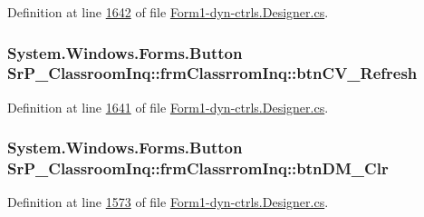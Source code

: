 \-Definition at line \hyperlink{_form1-dyn-ctrls_8_designer_8cs_source_l01642}{1642} of file \hyperlink{_form1-dyn-ctrls_8_designer_8cs_source}{\-Form1-\/dyn-\/ctrls.\-Designer.\-cs}.

\hypertarget{class_sr_p___classroom_inq_1_1frm_classrrom_inq_acab3b8f1dd8b8c6298dd2c11aa764a29}{
\subsubsection[{btn\-C\-V\-\_\-\-Refresh}]{\setlength{\rightskip}{0pt plus 5cm}\-System.\-Windows.\-Forms.\-Button {\bf \-Sr\-P\-\_\-\-Classroom\-Inq\-::frm\-Classrrom\-Inq\-::btn\-C\-V\-\_\-\-Refresh}}}
\label{class_sr_p___classroom_inq_1_1frm_classrrom_inq_acab3b8f1dd8b8c6298dd2c11aa764a29}


\-Definition at line \hyperlink{_form1-dyn-ctrls_8_designer_8cs_source_l01641}{1641} of file \hyperlink{_form1-dyn-ctrls_8_designer_8cs_source}{\-Form1-\/dyn-\/ctrls.\-Designer.\-cs}.

\hypertarget{class_sr_p___classroom_inq_1_1frm_classrrom_inq_a81852ce0a99da9e3b5838befcb9daedc}{
\subsubsection[{btn\-D\-M\-\_\-\-Clr}]{\setlength{\rightskip}{0pt plus 5cm}\-System.\-Windows.\-Forms.\-Button {\bf \-Sr\-P\-\_\-\-Classroom\-Inq\-::frm\-Classrrom\-Inq\-::btn\-D\-M\-\_\-\-Clr}}}
\label{class_sr_p___classroom_inq_1_1frm_classrrom_inq_a81852ce0a99da9e3b5838befcb9daedc}


\-Definition at line \hyperlink{_form1-dyn-ctrls_8_designer_8cs_source_l01573}{1573} of file \hyperlink{_form1-dyn-ctrls_8_designer_8cs_source}{\-Form1-\/dyn-\/ctrls.\-Designer.\-cs}.

